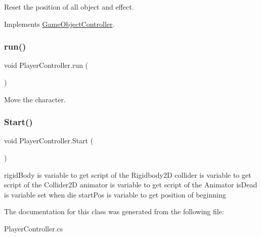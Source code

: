 Reset the position of all object and effect. 



Implements \hyperlink{class_game_object_controller_a5e57dfd66120a1400e5947f5664a41e4}{Game\+Object\+Controller}.

\hypertarget{class_player_controller_a3a495d7535b69bcc452118a4affcba4b}{}\label{class_player_controller_a3a495d7535b69bcc452118a4affcba4b} 
\subsubsection{\texorpdfstring{run()}{run()}}
{\footnotesize\ttfamily void Player\+Controller.\+run (\begin{DoxyParamCaption}{ }\end{DoxyParamCaption})\hspace{0.3cm}{\ttfamily [private]}}



Move the character. 

\hypertarget{class_player_controller_ae1117d9c4da3193181cddad2c814e467}{}\label{class_player_controller_ae1117d9c4da3193181cddad2c814e467} 
\subsubsection{\texorpdfstring{Start()}{Start()}}
{\footnotesize\ttfamily void Player\+Controller.\+Start (\begin{DoxyParamCaption}{ }\end{DoxyParamCaption})\hspace{0.3cm}{\ttfamily [private]}}



rigid\+Body is variable to get script of the Rigidbody2D collider is variable to get script of the Collider2D animator is variable to get script of the Animator is\+Dead is variable set when die start\+Pos is variable to get position of beginning 



The documentation for this class was generated from the following file\+:\begin{DoxyCompactItemize}
\item 
Player\+Controller.\+cs\end{DoxyCompactItemize}
